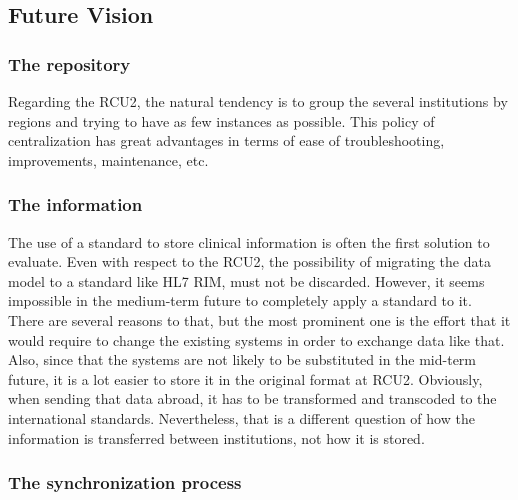 

\subsection{Future Vision}

\subsubsection{The repository}

Regarding the RCU2, the natural tendency is to group the several institutions by regions and trying to have as few instances as possible. This policy of centralization has great advantages in terms of ease of troubleshooting, improvements, maintenance, etc. 


\subsubsection{The information}

The use of a standard to store clinical information is often the first solution to evaluate. Even with respect to the RCU2, the possibility of migrating the data model to a standard like HL7 RIM, must not be discarded. However, it seems impossible in the medium-term future to completely apply a standard to it. There are several reasons to that, but the most prominent one is the effort that it would require to change the existing systems in order to exchange data like that.
Also, since that the systems are not likely to be substituted in the mid-term future, it is a lot easier to store it in the original format at RCU2. Obviously, when sending that data abroad, it has to be transformed and transcoded to the international standards. Nevertheless, that is a different question of how the information is transferred between institutions, not how it is stored. 


\subsubsection{The synchronization process}

